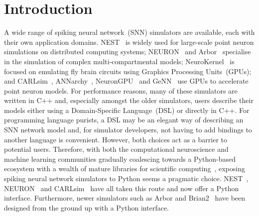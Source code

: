 \documentclass[utf8]{frontiersSCNS} %
\begin{document}
\section{Introduction}
A wide range of spiking neural network~(SNN) simulators are available, each with their own application domains. 
NEST~\citep{Gewaltig2007} is widely used for large-scale point neuron simulations on distributed computing systems; NEURON~\citep{carnevale2006neuron} and Arbor~\citep{Akar2019} specialise in the simulation of complex multi-compartmental models; NeuroKernel~\citep{Givon2016} is focused on emulating fly brain circuits using Graphics Processing Units~(GPUs); and CARLsim~\citep{Chou2018}, ANNarchy~\citep{Dinkelbach2015}, NeuronGPU~\citep{Golosio2020} and GeNN~\citep{Yavuz2016} use GPUs to accelerate point neuron models. 
For performance reasons, many of these simulators are written in C++ and, especially amongst the older simulators, users describe their models either using a Domain-Specific Language~(DSL) or directly in C++.
For programming language purists, a DSL may be an elegant way of describing an SNN network model and, for simulator developers, not having to add bindings to another language is convenient.
However, both choices act as a barrier to potential users.
Therefore, with both the computational neuroscience and machine learning communities gradually coalescing towards a Python-based ecosystem with a wealth of mature libraries for scientific computing~\citep{Hunter2007,VanDerWalt2011,Millman2011}, exposing spiking neural network simulators to Python seems a pragmatic choice.
NEST~\citep{Eppler2009}, NEURON~\citep{Hines2009} and CARLsim~\citep{Balaji2020} have all taken this route and now offer a Python interface.
Furthermore, newer simulators such as Arbor and Brian2~\citep{Stimberg2019} have been designed from the ground up with a Python interface.
\end{document}
